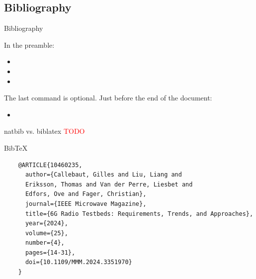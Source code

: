 \subsection{Bibliography}


\begin{frame}[fragile]{Bibliography}

In the preamble:
    \begin{itemize}
        \item[] 
        \item[] 
        \item[] 
    \end{itemize}
The last command is optional.
\somespace
Just before the end of the document:
    \begin{itemize}
        \item[] 
    \end{itemize}
\end{frame}


\begin{frame}{natbib vs. biblatex}
    \textcolor{red}{TODO}
\end{frame}


\begin{frame}{BibTeX}
    \begin{verbatim}
    @ARTICLE{10460235,
      author={Callebaut, Gilles and Liu, Liang and 
      Eriksson, Thomas and Van der Perre, Liesbet and 
      Edfors, Ove and Fager, Christian},
      journal={IEEE Microwave Magazine}, 
      title={6G Radio Testbeds: Requirements, Trends, and Approaches}, 
      year={2024},
      volume={25},
      number={4},
      pages={14-31},
      doi={10.1109/MMM.2024.3351970}
    }
    \end{verbatim}
\end{frame}


